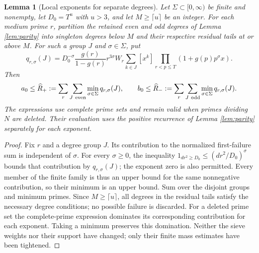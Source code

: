 \documentclass[11pt]{article}
\newtheorem{lemma}[theorem]{Lemma}
\begin{document}
\begin{lemma}[Local exponents for separate degrees]\label{lem:degreewise}
Let $\Sigma\subset[0,\infty)$ be finite and nonempty, let $D_0=T^u$
with $u>3$, and let $M\ge\lceil u\rceil$ be an integer.
For each medium prime $r$, partition the retained even and odd degrees
of Lemma \ref{lem:parity} into singleton degrees below $M$ and their
respective residual tails at or above $M$.
For such a group $J$ and $\sigma\in\Sigma$, put
\[
q_{r,\sigma}(J)=D_0^{-\sigma}\frac{g(r)}{1-g(r)}
r^{3\sigma}W_r
\sum_{k\in J}[x^k]\prod_{r<p\le T}(1+g(p)p^\sigma x).
\]
Then
\[
a_0\le\widehat R_+
 :=\sum_r\sum_{J\ {\rm even}}\min_{\sigma\in\Sigma}q_{r,\sigma}(J),
\qquad
b_0\le\widehat R_-
 :=\sum_r\sum_{J\ {\rm odd}}\min_{\sigma\in\Sigma}q_{r,\sigma}(J).
\]
The expressions use complete prime sets and remain valid when primes
dividing $N$ are deleted. Their evaluation uses the positive recurrence
of Lemma \ref{lem:parity} separately for each exponent.
\end{lemma}
\begin{proof}
Fix $r$ and a degree group $J$. Its contribution to the normalized
first-failure sum is independent of $\sigma$. For every $\sigma\ge0$,
the inequality
$1_{dr^2\ge D_0}\le(dr^2/D_0)^\sigma$ bounds that contribution by
$q_{r,\sigma}(J)$; the exponent zero is also permitted.
Every member of the finite family is thus an upper bound for the same
nonnegative contribution, so their minimum is an upper bound.
Sum over the disjoint groups and minimum primes.
Since $M\ge\lceil u\rceil$, all degrees in the residual tails satisfy
the necessary degree conditions; no possible failure is discarded.
For a deleted prime set the complete-prime expression dominates its
corresponding contribution for each exponent. Taking a minimum
preserves this domination. Neither the sieve weights nor their support
have changed; only their finite mass estimates have been tightened.
\end{proof}
\end{document}
